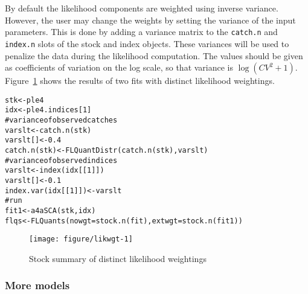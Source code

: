 \documentclass[a4paper,english,10pt]{article}\usepackage[]{graphicx}\usepackage[]{color}
\makeatletter
\def\maxwidth{ %
  \ifdim\Gin@nat@width>\linewidth
    \linewidth
  \else
    \Gin@nat@width
  \fi
}
\newcommand{\hlnum}[1]{\textcolor[rgb]{0.2,0.2,0.2}{#1}}%
\newcommand{\hlcom}[1]{\textcolor[rgb]{0.2,0.267,0.4}{#1}}%
\newcommand{\hlstd}[1]{\textcolor[rgb]{0,0,0}{#1}}%
\newcommand{\hlkwb}[1]{\textcolor[rgb]{0.361,0.506,0.596}{#1}}%
\newcommand{\hlkwc}[1]{\textcolor[rgb]{0.361,0.506,0.596}{#1}}%
\newcommand{\hlkwd}[1]{\textcolor[rgb]{0.361,0.506,0.596}{#1}}%
\newenvironment{kframe}{%
 \def\at@end@of@kframe{}%
 \ifinner\ifhmode%
  \def\at@end@of@kframe{\end{minipage}}%
  \begin{minipage}{\columnwidth}%
 \fi\fi%
 \def\FrameCommand##1{\hskip\@totalleftmargin \hskip-\fboxsep
 \colorbox{shadecolor}{##1}\hskip-\fboxsep
     \hskip-\linewidth \hskip-\@totalleftmargin \hskip\columnwidth}%
 \MakeFramed {\advance\hsize-\width
   \@totalleftmargin\z@ \linewidth\hsize
   \@setminipage}}%
 {\par\unskip\endMakeFramed%
 \at@end@of@kframe}
\newenvironment{knitrout}{}{} %
\newcommand{\code}[1]{{\texttt{#1}}}
\makeatother
\begin{document}
By default the likelihood components are weighted using inverse variance. However, the user may change the weights by setting the variance of the input parameters. This is done by adding a variance matrix to the \code{catch.n} and \code{index.n} slots of the stock and index objects. These variances will be used to penalize the data during the likelihood computation. The values should be given as coefficients of variation on the log scale, so that variance is $\log{({CV}^2 + 1)}$. Figure~\ref{fig:likwgt} shows the results of two fits with distinct likelihood weightings.

\begin{knitrout}
\color{fgcolor}\begin{kframe}
\begin{alltt}
\hlstd{stk} \hlkwb{<-} \hlstd{ple4}
\hlstd{idx} \hlkwb{<-} \hlstd{ple4.indices[}\hlnum{1}\hlstd{]}
\hlcom{# variance of observed catches}
\hlstd{varslt} \hlkwb{<-} \hlkwd{catch.n}\hlstd{(stk)}
\hlstd{varslt[]} \hlkwb{<-} \hlnum{0.4}
\hlkwd{catch.n}\hlstd{(stk)} \hlkwb{<-} \hlkwd{FLQuantDistr}\hlstd{(}\hlkwd{catch.n}\hlstd{(stk), varslt)}
\hlcom{# variance of observed indices}
\hlstd{varslt} \hlkwb{<-} \hlkwd{index}\hlstd{(idx[[}\hlnum{1}\hlstd{]])}
\hlstd{varslt[]} \hlkwb{<-} \hlnum{0.1}
\hlkwd{index.var}\hlstd{(idx[[}\hlnum{1}\hlstd{]])} \hlkwb{<-} \hlstd{varslt}
\hlcom{# run}
\hlstd{fit1} \hlkwb{<-} \hlkwd{a4aSCA}\hlstd{(stk, idx)}
\hlstd{flqs} \hlkwb{<-} \hlkwd{FLQuants}\hlstd{(}\hlkwc{nowgt}\hlstd{=}\hlkwd{stock.n}\hlstd{(fit),} \hlkwc{extwgt}\hlstd{=}\hlkwd{stock.n}\hlstd{(fit1))}
\end{alltt}
\end{kframe}
\end{knitrout}

\begin{knitrout}
\color{fgcolor}\begin{figure}[H]

{\centering \texttt{[image: figure/likwgt-1]} 

}

\caption[Stock summary of distinct likelihood weightings]{Stock summary of distinct likelihood weightings}\label{fig:likwgt}
\end{figure}


\end{knitrout}

\subsubsection{More models}
\end{document}
